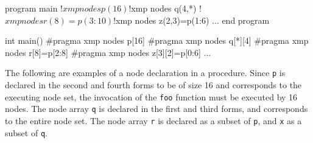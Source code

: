 \begin{minipage}{0.45\hsize}
\begin{center}
\begin{XFexample}
      program main
!$xmp nodes p(16)
!$xmp nodes q(4,*)
!$xmp nodes r(8)=p(3:10)
!$xmp nodes z(2,3)=p(1:6)
      ...       
      end program 
\end{XFexample}
\end{center}
\end{minipage}
%
\begin{minipage}{0.45\hsize}
\begin{center}
\begin{XCexampleR}
int main() {
#pragma xmp nodes p[16]
#pragma xmp nodes q[*][4]
#pragma xmp nodes r[8]=p[2:8]
#pragma xmp nodes z[3][2]=p[0:6]
    ...
}
\end{XCexampleR}
\end{center}
\end{minipage}

\vspace{0.5cm}

%

The following are examples of a node declaration in a procedure.
Since {\tt p} is declared in the second and fourth forms to be of size 16 and
corresponds to the executing node set, the invocation of the {\tt foo}
function must be executed by 16 nodes.
%
The node array {\tt q} is declared in the first and third forms, and corresponds to
the entire node set. The node array {\tt r} is declared as a subset of
{\tt p}, and {\tt x} as a subset of {\tt q}.


